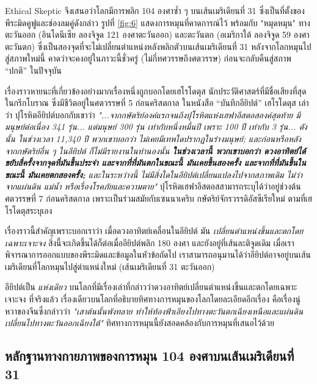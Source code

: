 \documentclass[10pt,twocolumn,letterpaper]{article}
\begin{document}
Ethical Skeptic จึงเสนอว่าโลกมีการพลิก 104 องศาซ้ำ ๆ บนเส้นเมริเดียนที่ 31 ซึ่งเป็นที่ตั้งของพีระมิดคูฟูและช่องลมคู่ดังกล่าว รูปที่ \ref{fig:6} แสดงการหมุนที่คาดการณ์ไว้ พร้อมกับ "หมุดหมุน" ทางตะวันออก (อินโดนีเซีย ลองจิจูด 121 องศาตะวันออก) และตะวันตก (อเมริกาใต้ ลองจิจูด 59 องศาตะวันตก) ซึ่งเป็นสองจุดที่จะไม่เปลี่ยนตำแหน่งหลังพลิกตัวบนเส้นเมริเดียนที่ 31 หลังจากโลกหมุนไปสู่สภาพใหม่นี้ คาดว่าจะคงอยู่ในภาวะนี้ชั่วครู่ (ไม่กี่ทศวรรษถึงศตวรรษ) ก่อนจะกลับคืนสู่สภาพ “ปกติ” ในปัจจุบัน \cite{150}

เรื่องราวหายนะที่เกี่ยวข้องอย่างมากเรื่องหนึ่งถูกบอกโดยเฮโรโดตุส นักประวัติศาสตร์ที่มีชื่อเสียงที่สุดในกรีกโบราณ ซึ่งมีชีวิตอยู่ในศตวรรษที่ 5 ก่อนคริสตกาล \cite{31} ในหนังสือ “บันทึกอียิปต์” เฮโรโดตุส เล่าว่า ปุโรหิตอียิปต์บอกกับเขาว่า \textit{"...จากกษัตริย์องค์แรกจนถึงปุโรหิตแห่งเฮฟาอีสตอสองค์สุดท้าย มีมนุษย์ต่อเนื่อง 341 รุ่น... แต่มนุษย์ 300 รุ่น เท่ากับหนึ่งหมื่นปี เพราะ 100 ปี เท่ากับ 3 รุ่น... ดังนั้น ในช่วงเวลา 11,340 ปี พวกเขาบอกว่า ไม่เคยมีเทพใดปรากฏในร่างมนุษย์; และก่อนหรือหลังจากกษัตริย์อื่น ๆ ในอียิปต์ ก็ไม่มีรายงานในทำนองนั้น \textbf{ในช่วงเวลานี้ พวกเขาบอกว่า ดวงอาทิตย์ได้ขยับสี่ครั้งจากจุดที่มันขึ้นประจำ และจากที่ที่มันตกในขณะนี้ มันเคยขึ้นสองครั้ง และจากที่ที่มันขึ้นในขณะนี้ มันเคยตกสองครั้ง;} และในระหว่างนี้ ไม่มีสิ่งใดในอียิปต์เปลี่ยนแปลงไปจากสภาพเดิม ไม่ว่าจากแผ่นดิน แม่น้ำ หรือเรื่องโรคภัยและความตาย"} \cite{32} ปุโรหิตเฮฟาอีสตอสสามารถระบุได้ว่าอยู่ช่วงต้นศตวรรษที่ 7 ก่อนคริสตกาล เพราะเป็นร่วมสมัยกับเซนนาเคริบ กษัตริย์จักรวรรดิอัสซีเรียใหม่ ตามที่เฮโรโดตุสระบุเอง \cite{32,33,34}

เรื่องราวนี้สำคัญเพราะบอกเราว่า เมื่อดวงอาทิตย์เคลื่อนในอียิปต์ มัน \textit{เปลี่ยนตำแหน่งขึ้นและตกโดยเฉพาะเจาะจง} สิ่งนี้จะเกิดขึ้นได้ก็ต่อเมื่ออียิปต์พลิก 180 องศา และยังอยู่ที่เส้นละติจูดเดิม เมื่อเราพิจารณาการออกแบบของพีระมิดและข้อมูลในหัวข้อถัดไป เราสามารถอนุมานได้ว่าอียิปต์อาจอยู่บนเส้นเมริเดียนที่โลกหมุนไปสู่ตำแหน่งใหม่ (เส้นเมริเดียนที่ 31 ตะวันออก)

อียิปต์เป็น \textit{แห่งเดียว} บนโลกที่มีเรื่องเล่าที่กล่าวว่าดวงอาทิตย์เปลี่ยนตำแหน่งขึ้นและตกโดยเฉพาะเจาะจง ที่จริงแล้ว เรื่องเดียวบนโลกที่อธิบายทิศทางการหมุนของโลกโดยละเอียดอีกเรื่อง คือเรื่องนู่หวาของจีนซึ่งกล่าวว่า \textit{"เสาต้นนั้นพังทลาย ทำให้ท้องฟ้าเอียงไปทางตะวันตกเฉียงเหนือและแผ่นดินเปลี่ยนไปทางตะวันออกเฉียงใต้"} \cite{8} ทิศทางการหมุนนี้ยังสอดคล้องกับการหมุนที่เสนอไว้ด้วย

\subsection{หลักฐานทางกายภาพของการหมุน 104 องศาบนเส้นเมริเดียนที่ 31}
\end{document}
